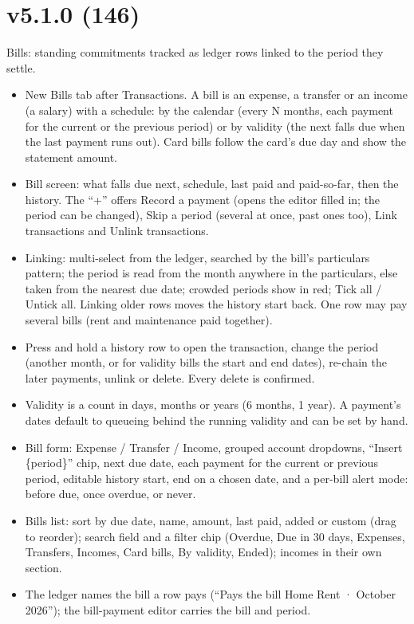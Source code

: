 \documentclass{article}
\begin{document}
    \section{v5.1.0 (146)}\label{sec:146}
    Bills: standing commitments tracked as ledger rows linked to the period they settle.
    \begin{itemize}
        \item New Bills tab after Transactions. A bill is an expense, a transfer or an income (a salary) with a schedule: by the calendar (every N months, each payment for the current or the previous period) or by validity (the next falls due when the last payment runs out). Card bills follow the card's due day and show the statement amount.
        \item Bill screen: what falls due next, schedule, last paid and paid-so-far, then the history. The ``+'' offers Record a payment (opens the editor filled in; the period can be changed), Skip a period (several at once, past ones too), Link transactions and Unlink transactions.
        \item Linking: multi-select from the ledger, searched by the bill's particulars pattern; the period is read from the month anywhere in the particulars, else taken from the nearest due date; crowded periods show in red; Tick all / Untick all. Linking older rows moves the history start back. One row may pay several bills (rent and maintenance paid together).
        \item Press and hold a history row to open the transaction, change the period (another month, or for validity bills the start and end dates), re-chain the later payments, unlink or delete. Every delete is confirmed.
        \item Validity is a count in days, months or years (6 months, 1 year). A payment's dates default to queueing behind the running validity and can be set by hand.
        \item Bill form: Expense / Transfer / Income, grouped account dropdowns, ``Insert \{period\}'' chip, next due date, each payment for the current or previous period, editable history start, end on a chosen date, and a per-bill alert mode: before due, once overdue, or never.
        \item Bills list: sort by due date, name, amount, last paid, added or custom (drag to reorder); search field and a filter chip (Overdue, Due in 30 days, Expenses, Transfers, Incomes, Card bills, By validity, Ended); incomes in their own section.
        \item The ledger names the bill a row pays (``Pays the bill Home Rent · October 2026''); the bill-payment editor carries the bill and period.

\end{itemize}
\end{document}
